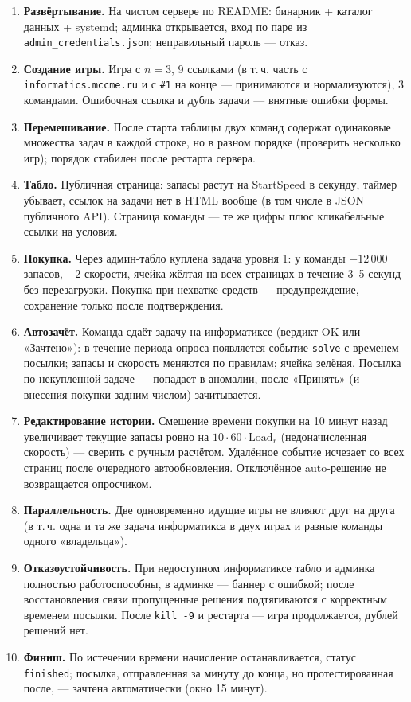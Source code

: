 \documentclass[12pt,a4paper]{article}
\newcommand{\field}[1]{\texttt{#1}}
\newcommand{\btn}[1]{«#1»}
\begin{document}
\begin{enumerate}
  \item \textbf{Развёртывание.} На чистом сервере по README: бинарник +
        каталог данных + systemd; админка открывается, вход по паре из
        \field{admin\_credentials.json}; неправильный пароль --- отказ.
  \item \textbf{Создание игры.} Игра с $n=3$, 9 ссылками (в т.\,ч. часть
        с \field{informatics.mccme.ru} и с \field{\#1} на конце ---
        принимаются и нормализуются), 3 командами. Ошибочная ссылка и
        дубль задачи --- внятные ошибки формы.
  \item \textbf{Перемешивание.} После старта таблицы двух команд содержат
        одинаковые множества задач в каждой строке, но в разном порядке
        (проверить несколько игр); порядок стабилен после рестарта сервера.
  \item \textbf{Табло.} Публичная страница: запасы растут на
        StartSpeed в секунду, таймер убывает, ссылок на задачи нет в HTML
        вообще (в том числе в JSON публичного API). Страница команды ---
        те же цифры плюс кликабельные ссылки на условия.
  \item \textbf{Покупка.} Через админ-табло куплена задача уровня 1:
        у команды $-12\,000$ запасов, $-2$ скорости, ячейка жёлтая на всех
        страницах в течение 3--5 секунд без перезагрузки. Покупка при
        нехватке средств --- предупреждение, сохранение только после
        подтверждения.
  \item \textbf{Автозачёт.} Команда сдаёт задачу на информатиксе (вердикт
        OK или «Зачтено»): в течение периода опроса появляется событие
        \field{solve} с временем посылки; запасы и скорость меняются по
        правилам; ячейка зелёная. Посылка по некупленной задаче --- попадает
        в аномалии, после \btn{Принять} (и внесения покупки задним числом)
        зачитывается.
  \item \textbf{Редактирование истории.} Смещение времени покупки на
        10 минут назад увеличивает текущие запасы ровно на
        $10 \cdot 60 \cdot \mathrm{Load}_r$ (недоначисленная скорость) ---
        сверить с ручным расчётом. Удалённое событие исчезает со всех
        страниц после очередного автообновления. Отключённое auto-решение
        не возвращается опросчиком.
  \item \textbf{Параллельность.} Две одновременно идущие игры не влияют
        друг на друга (в т.\,ч. одна и та же задача информатикса в двух
        играх и разные команды одного «владельца»).
  \item \textbf{Отказоустойчивость.} При недоступном информатиксе табло и
        админка полностью работоспособны, в админке --- баннер с ошибкой;
        после восстановления связи пропущенные решения подтягиваются с
        корректным временем посылки. После \field{kill -9} и рестарта ---
        игра продолжается, дублей решений нет.
  \item \textbf{Финиш.} По истечении времени начисление останавливается,
        статус \field{finished}; посылка, отправленная за минуту до конца,
        но протестированная после, --- зачтена автоматически (окно
        15 минут).
\end{enumerate}
\end{document}
